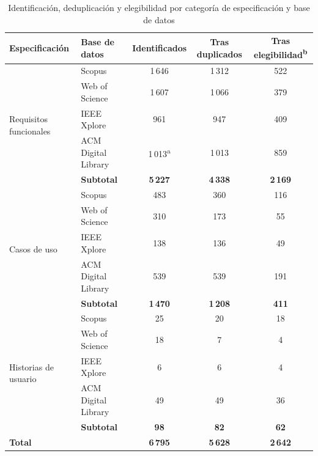 \documentclass[10pt,journal,twoside,letterpaper]{IEEEtran}
\begin{document}
    \begin{table}[!tb]
        \caption{Identificación, deduplicación y elegibilidad por categoría de especificación y base de datos}
        \label{tab:distrib}
        \centering
        \small
        \setlength{\tabcolsep}{6pt}
        \begin{tabular}{@{}llccc@{}}
            \toprule
            \textbf{Especificación} & \textbf{Base de datos} & \textbf{Identificados} & \textbf{Tras duplicados} & \textbf{Tras elegibilidad\textsuperscript{b}} \\
            \midrule
            \multirow{5}{*}{Requisitos funcionales} & Scopus & 1\,646 & 1\,312 & 522 \\
            & Web of Science      & 1\,607 & 1\,066 & 379 \\
            & IEEE Xplore         & 961    & 947    & 409 \\
            & ACM Digital Library & 1\,013\textsuperscript{a} & 1\,013 & 859 \\
            \cmidrule(l){2-5}
            & \textbf{Subtotal}   & \textbf{5\,227} & \textbf{4\,338} & \textbf{2\,169} \\
            \midrule
            \multirow{5}{*}{Casos de uso} & Scopus & 483 & 360 & 116 \\
            & Web of Science      & 310 & 173 & 55 \\
            & IEEE Xplore         & 138 & 136 & 49 \\
            & ACM Digital Library & 539 & 539 & 191 \\
            \cmidrule(l){2-5}
            & \textbf{Subtotal}   & \textbf{1\,470} & \textbf{1\,208} & \textbf{411} \\
            \midrule
            \multirow{5}{*}{Historias de usuario} & Scopus & 25 & 20 & 18 \\
            & Web of Science      & 18 & 7 & 4 \\
            & IEEE Xplore         & 6 & 6 & 4 \\
            & ACM Digital Library & 49 & 49 & 36 \\
            \cmidrule(l){2-5}
            & \textbf{Subtotal}   & \textbf{98} & \textbf{82} & \textbf{62} \\
            \midrule
            \textbf{Total} & & \textbf{6\,795} & \textbf{5\,628} & \textbf{2\,642} \\
            \bottomrule
        \end{tabular}
        \\[3pt]

\end{table}
\end{document}
